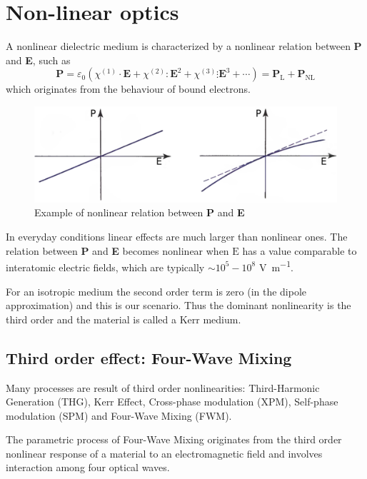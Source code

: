 \documentclass[12pt,a4paper,twoside]{article}
\begin{document}
\clearpage
\section{Non-linear optics}

A nonlinear dielectric medium is characterized by a nonlinear relation between \textbf{P} and \textbf{E}, such as
\begin{equation}
	\textbf{P} = \varepsilon_0 \left( \chi^{(1)} \cdot \textbf{E} + \chi^{(2)} : \textbf{E}^2 + \chi^{(3)} \vdots \textbf{E}^3 + \cdots \right) = \mathrm{\textbf{P}_L} + \mathrm{\textbf{P}_{NL}}
	\label{eq_P_general}
\end{equation}
which originates from the behaviour of bound electrons.

\begin{figure}[!ht]
	\centering
	\includegraphics[width=.75\textwidth]{nonlinearity.png}
	\caption{Example of nonlinear relation between \textbf{P} and \textbf{E}}
	\label{fig_nonlinearity}
\end{figure}

In everyday conditions linear effects are much larger than nonlinear ones.
The relation between \textbf{P} and \textbf{E} becomes nonlinear when $\mathrm{E}$ has a value comparable to interatomic electric fields, which are typically $\sim 10^5-10^8$ \si{\V\per\m}.

For an isotropic medium the second order term is zero (in the dipole approximation) and this is our scenario.
Thus the dominant nonlinearity is the third order and the material is called a Kerr medium.

\subsection{Third order effect: Four-Wave Mixing}
Many processes are result of third order nonlinearities: Third-Harmonic Generation (THG), Kerr Effect, Cross-phase modulation (XPM), Self-phase modulation (SPM) and Four-Wave Mixing (FWM).

The parametric process of Four-Wave Mixing originates from the third order nonlinear response of a material to an electromagnetic field and involves interaction among four optical waves.
\end{document}
